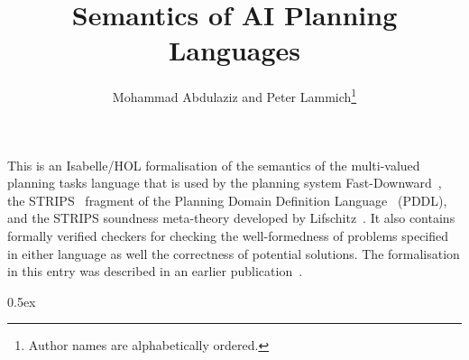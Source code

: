 \documentclass[11pt,a4paper]{article}
\begin{document}
\title{Semantics of AI Planning Languages}
\author{Mohammad Abdulaziz and Peter Lammich\footnote{Author names are alphabetically ordered.}}

\date{}

\maketitle

This is an Isabelle/HOL formalisation of the semantics of the multi-valued planning tasks language that is used by the planning system Fast-Downward~\cite{helmert2006fast}, the STRIPS~\cite{fikes1971strips} fragment of the Planning Domain Definition Language~\cite{PDDLref} (PDDL), and the STRIPS soundness meta-theory developed by Lifschitz~\cite{lifschitz1987semantics}.
It also contains formally verified checkers for checking the well-formedness of problems specified in either language as well the correctness of potential solutions.
The formalisation in this entry was described in an earlier publication~\cite{ictai2018}.

\tableofcontents

\clearpage

\parindent 0pt\parskip 0.5ex





\end{document}
